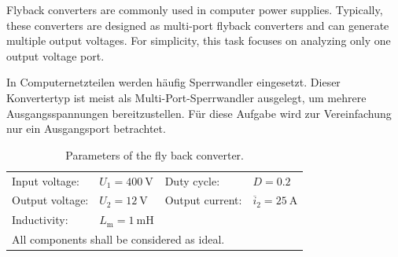 

Flyback converters are commonly used in computer power supplies. Typically, these converters are designed as
multi-port flyback converters and can generate multiple output voltages.
For simplicity, this task focuses on analyzing only one output voltage port.

\begin{germanblock}
	In Computernetzteilen werden häufig Sperrwandler eingesetzt. Dieser Konvertertyp ist meist als Multi-Port-Sperrwandler ausgelegt, um mehrere Ausgangsspannungen bereitzustellen.
	Für diese Aufgabe wird zur Vereinfachung nur ein Ausgangsport betrachtet.
\end{germanblock}

\color{black}

\begin{table}[ht]
	\centering  %
	\begin{tabular}{llll}
		\toprule
		Input voltage:  & $U_\mathrm{1} = \SI{400}{\volt}$      & Duty cycle:     & $D = 0.2$                                    \\
		Output voltage: & $U_\mathrm{2} = \SI{12}{\volt}$       & Output current: & $\overline{i}_\mathrm{2} = \SI{25}{\ampere}$ \\
		Inductivity:    & $L_\mathrm{m} = \SI{1}{\milli\henry}$ &                 &                                              \\
		\midrule
		\multicolumn{4}{l}{\quad All components shall be considered as ideal.}                                                   \\
		\bottomrule
	\end{tabular}
	\caption{Parameters of the fly back converter.}  %
	\label{table:FlybackConverter}
\end{table}



